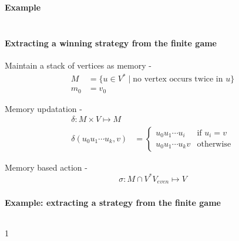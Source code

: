 \documentclass{beamer}
\newenvironment{slide}
{\begin{frame}[environment=slide]
\frametitle{\insertsection}}
{\end{frame}}
\begin{document}
  \begin{slide}
    \framesubtitle{Example}
    \begin{columns}
    \scalebox{0.65}{}
    \scalebox{0.65}{}
    \end{columns}
  \end{slide}

  \begin{slide}
    \framesubtitle{Extracting a winning strategy from the finite game}
    Maintain a stack of vertices as memory -
    \begin{align*}
        M &= \{ u \in V^* \mid \text{no vertex occurs twice in } u \}\\
        m_0 &= v_0
    \end{align*}

    Memory updatation -
    \begin{align*}
        \delta : M \times V \mapsto M \\
        \delta(u_0u_1\cdots u_k, v) &=
            \begin{cases}
                u_0u_1\cdots u_i   &  \text{if } u_i=v\\
                u_0u_1\cdots u_k v & \text{otherwise}
            \end{cases}
    \end{align*}

    Memory based action -
    \[
        \sigma : M \cap V^*V_{even} \mapsto V
    \]
  \end{slide}

  \begin{slide}
    \framesubtitle{Example: extracting a strategy from the finite game}
    \begin{columns}
    \scalebox{0.65}{}
    1 
    \end{columns}
  \end{slide}
\end{document}
